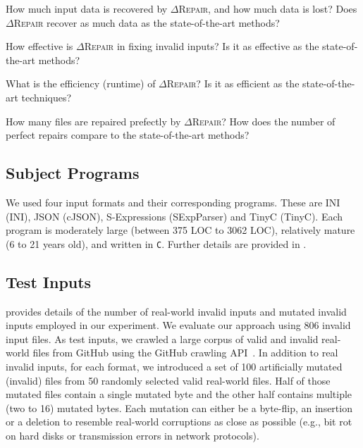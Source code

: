 \documentclass[acmsmall,screen,review,anonymous]{acmart}
\newcommand{\approach}{\textsc{$\Delta$Repair}\xspace}
\def\<#1>{\texttt{#1}}
\begin{document}
\begin{description}[labelwidth=!, labelindent=15pt]

\item[RQ1: Data Recovery and Data Loss.]
How much input data is recovered by \approach, and how much data is lost? %
Does \approach recover as much data as 
the state-of-the-art methods?

  \item[RQ2: Effectiveness.]  %
How effective is \approach in fixing invalid inputs? Is it as effective as the state-of-the-art methods?

\item[RQ3: Efficiency.] What is the efficiency (runtime) of
\approach? Is it as efficient as the state-of-the-art techniques?

\item[RQ4: Perfect Repair.] How many files are repaired prefectly by
\approach? How does the number of perfect repairs compare to the state-of-the-art methods?

\end{description}


\subsection{Subject Programs} %
We used four input formats and their corresponding programs. These are INI (INI), JSON (cJSON), S-Expressions (SExpParser) and TinyC (TinyC). Each program is moderately large (between 375 LOC to 3062 LOC), relatively mature (6 to 21 years old), and written in \<C>. Further details are provided in .

\subsection{Test Inputs} 
 provides details of the number of
real-world invalid inputs and mutated invalid inputs employed in our experiment.
We evaluate our approach using 806 invalid input files. %
As test inputs, we crawled a large corpus of valid and invalid real-world files
from GitHub using the GitHub crawling API~\cite{githubapi}. 
In addition to real invalid inputs, for each format, we introduced a set of 100 artificially mutated (invalid) files
from 50 randomly selected valid real-world files.
Half of those mutated files contain a single mutated byte and the other half
contains multiple (two to 16) mutated bytes.
Each mutation can either be a byte-flip, an insertion or a deletion to 
resemble real-world corruptions as close as possible
(e.g., bit rot on hard disks or transmission errors in network protocols).
\end{document}
